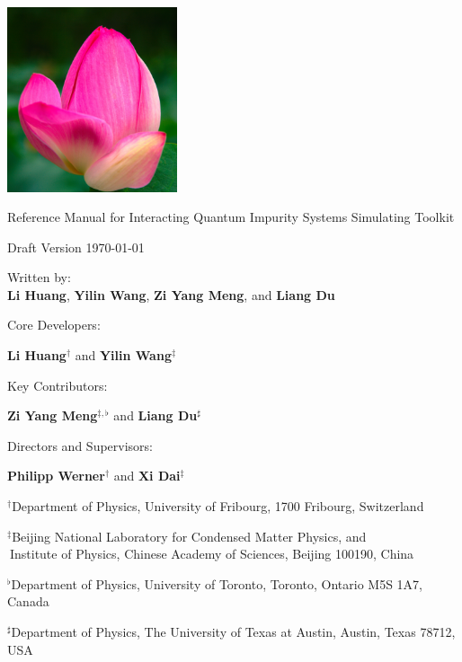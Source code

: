 {
\pagestyle{plain}
\parindent 0pt
\vbox{}

\includegraphics[width=5cm]{figure/cover.png}

\Huge{\textsf{Reference Manual for {\color{red}I}nteracting {\color{cyan}Q}uantum {\color{cyan}I}mpurity {\color{cyan}S}ystems Simulating {\color{cyan}T}oolkit}}

\Large{\textsf{Draft Version \today}}

\Large{\textsf{Written by}:\\ \textbf{Li Huang}, \textbf{Yilin Wang}, \textbf{Zi Yang Meng}, and \textbf{Liang Du}}

\vbox{}
\clearpage

\Large{Core Developers:}

\Large{\textbf{Li Huang}$^{\dagger}$ and \textbf{Yilin Wang}$^{\ddagger}$}

\Large{Key Contributors:}

\Large{\textbf{Zi Yang Meng}$^{\ddagger, \flat}$ and \textbf{Liang Du}$^{\sharp}$}

\Large{Directors and Supervisors:}

\Large{\textbf{Philipp Werner}$^{\dagger}$ and \textbf{Xi Dai}$^{\ddagger}$}

\vskip 1.0cm
$^{\dagger}$\large{\textsf{Department of Physics, University of Fribourg, 1700 Fribourg, Switzerland}}

$^{\ddagger}$\large{\textsf{Beijing National Laboratory for Condensed Matter Physics, and \\ 
$^{\ }$Institute of Physics, Chinese Academy of Sciences, Beijing 100190, China}}

$^{\flat}$\large{\textsf{Department of Physics, University of Toronto, Toronto, Ontario M5S 1A7, Canada}}

$^{\sharp}$\large{\textsf{Department of Physics, The University of Texas at Austin, Austin, Texas 78712, USA}}

\vbox{}         
\clearpage
}

